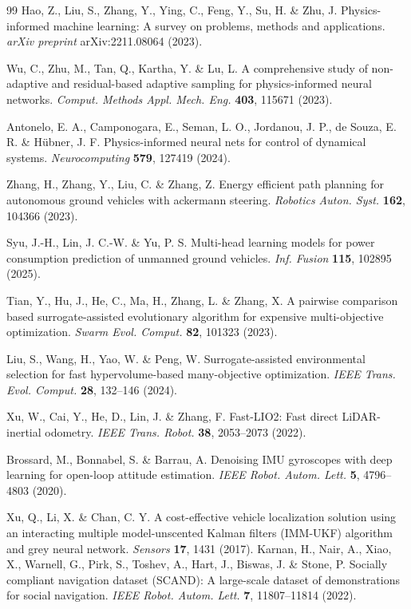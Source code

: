 \documentclass[pdflatex,sn-nature]{sn-jnl}%
\begin{document}
\begin{thebibliography}{99}
Hao, Z., Liu, S., Zhang, Y., Ying, C., Feng, Y., Su, H. \& Zhu, J. Physics-informed machine learning: A survey on problems, methods and applications. \textit{arXiv preprint} arXiv:2211.08064 (2023).

Wu, C., Zhu, M., Tan, Q., Kartha, Y. \& Lu, L. A comprehensive study of non-adaptive and residual-based adaptive sampling for physics-informed neural networks.
\emph{Comput. Methods Appl. Mech. Eng.} \textbf{403}, 115671 (2023).


Antonelo, E. A., Camponogara, E., Seman, L. O., Jordanou, J. P., de Souza, E. R. \& Hübner, J. F. Physics-informed neural nets for control of dynamical systems.
\textit{Neurocomputing} \textbf{579}, 127419 (2024).

Zhang, H., Zhang, Y., Liu, C. \& Zhang, Z. Energy efficient path planning for autonomous ground vehicles with ackermann steering.
\textit{Robotics Auton. Syst.} \textbf{162}, 104366 (2023).

Syu, J.-H., Lin, J. C.-W. \& Yu, P. S. Multi-head learning models for power consumption prediction of unmanned ground vehicles.
\textit{Inf. Fusion} \textbf{115}, 102895 (2025).

Tian, Y., Hu, J., He, C., Ma, H., Zhang, L. \& Zhang, X. A pairwise comparison based surrogate-assisted evolutionary algorithm for expensive multi-objective optimization.
\emph{Swarm Evol. Comput.} \textbf{82}, 101323 (2023).

Liu, S., Wang, H., Yao, W. \& Peng, W. Surrogate-assisted environmental selection for fast hypervolume-based many-objective optimization.
\emph{IEEE Trans. Evol. Comput.} \textbf{28}, 132--146 (2024).

Xu, W., Cai, Y., He, D., Lin, J. \& Zhang, F. Fast-LIO2: Fast direct LiDAR-inertial odometry. \textit{IEEE Trans. Robot.} \textbf{38}, 2053--2073 (2022).


Brossard, M., Bonnabel, S. \& Barrau, A. Denoising IMU gyroscopes with deep learning for open-loop attitude estimation.
\emph{IEEE Robot. Autom. Lett.} \textbf{5}, 4796--4803 (2020).

Xu, Q., Li, X. \& Chan, C. Y. A cost-effective vehicle localization solution using an interacting multiple model-unscented Kalman filters (IMM-UKF) algorithm and grey neural network.
\emph{Sensors} \textbf{17}, 1431 (2017).
Karnan, H., Nair, A., Xiao, X., Warnell, G., Pirk, S., Toshev, A., Hart, J., Biswas, J. \& Stone, P. Socially compliant navigation dataset (SCAND): A large-scale dataset of demonstrations for social navigation.
\emph{IEEE Robot. Autom. Lett.} \textbf{7}, 11807--11814 (2022).


\end{thebibliography}
\end{document}
